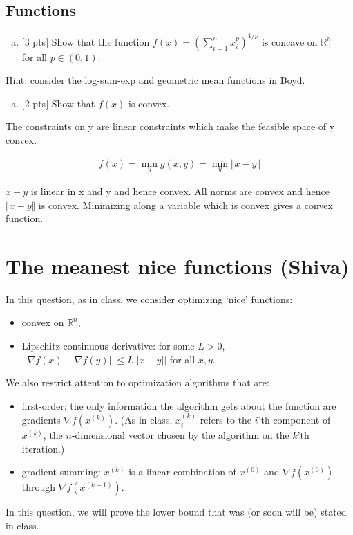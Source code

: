 \documentclass[12pt]{article}
\begin{document}
\subsection{Functions}

\begin{enumerate}[(a)]
\item
$[$3 pts$]$  Show that the function $f(x) = \left( \sum_{i=1}^n x_i^p\right)^{1/p}$ is concave on $\mathbb{R}^n_{++}$ for all $p\in(0,1)$.
\end{enumerate}
Hint: consider the log-sum-exp and geometric mean functions in Boyd.

\vspace{.5cm}

\begin{enumerate}[(b)]
\item
$[$2 pts$]$  Show that $f(x)$ is convex.
\end{enumerate}

The constraints on y are linear constraints which make the feasible space of y convex. 

\begin{align*}
f(x) = \min_y g(x,y) = \min_y \Vert x - y \Vert 
\end{align*}

$x-y$ is linear in x and y and hence convex. All norms are convex and hence $\Vert x - y \Vert$ is convex. Minimizing along a variable which is convex gives a convex function. 
\newpage
\clearpage


\section{The meanest nice functions (Shiva)}

In this question, as in class, we consider optimizing `nice' functions: \begin{itemize}
\item convex on $\mathbb{R}^n$,
\item Lipschitz-continuous derivative: for some $L > 0$, $||\nabla f(x) - \nabla f(y)|| \leq L ||x - y||$ for all $x,y$.
\end{itemize}
We also restrict attention to optimization algorithms that are:
\begin{itemize}
\item first-order: the only information the algorithm gets about the function are gradients $\nabla f(x^{(k)})$. (As in class, $x^{(k)}_i$ refers to the $i$'th component of $x^{(k)}$, the $n$-dimensional vector chosen by the algorithm on the $k$'th iteration.)
\item gradient-summing: $x^{(k)}$ is a linear combination of $x^{(0)}$ and $\nabla f(x^{(0)})$ through $\nabla f(x^{(k-1)})$. 
\end{itemize}
In this question, we will prove the lower bound that was (or soon will be) stated in class.
\end{document}
